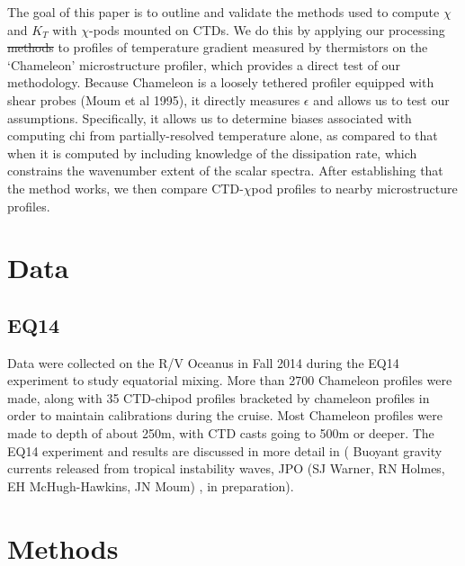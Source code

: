 \documentclass{ametsoc}
\providecommand{\DIFadd}[1]{{\protect\color{blue}\uwave{#1}}} %
\providecommand{\DIFdel}[1]{{\protect\color{red}\sout{#1}}}                      %
\providecommand{\DIFaddbegin}{} %
\providecommand{\DIFaddend}{} %
\providecommand{\DIFdelbegin}{} %
\providecommand{\DIFdelend}{} %
\begin{document}
The goal of this paper is to outline and validate the methods used to compute $\chi$ and $K_T$ with $\chi$-pods mounted on CTDs.  We do this by applying our processing \DIFdelbegin \DIFdel{methods }\DIFdelend \DIFaddbegin \DIFadd{methodology }\DIFaddend to profiles of temperature gradient measured by thermistors on the `Chameleon' microstructure profiler, which provides a direct test of our methodology.  Because Chameleon is a loosely tethered profiler equipped with shear probes (Moum et al 1995), it directly measures $\epsilon$ and allows us to test our assumptions.  Specifically, it allows us to determine biases associated with computing chi from partially-resolved temperature alone, as compared to that when it is computed by including knowledge of the dissipation rate, which constrains the wavenumber extent of the scalar spectra.   After establishing that the method works, we then compare CTD-$\chi$pod profiles to nearby microstructure profiles.%



\section{Data }


\subsection{EQ14}

Data were collected on the R/V Oceanus in Fall 2014 during the EQ14 experiment to study equatorial mixing.  More than 2700 Chameleon profiles were made, along with 35 CTD-chipod profiles bracketed by chameleon profiles in order to maintain calibrations during the cruise. Most Chameleon profiles were made to depth of about 250m, with CTD casts going to 500m or deeper. The EQ14 experiment and results are discussed in more detail in ( Buoyant gravity currents released from tropical instability waves, JPO (SJ Warner, RN Holmes, EH McHugh-Hawkins, JN Moum) , in preparation).




\section{Methods}
\end{document}
